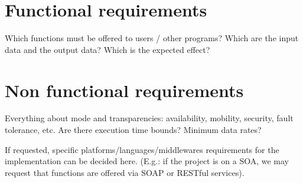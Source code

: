 
\section{Functional requirements}
\label{sec:func-req}
Which functions must be offered to users / other programs?
Which are the input data and the output data?
Which is the expected effect?


\section{Non functional requirements}
\label{sec:nonfunc-req}
Everything about mode and transparencies:
availability, mobility, security, fault tolerance, etc.
Are there execution time bounds? Minimum data rates?

If requested, specific platforms/languages/middlewares requirements
for the implementation can be decided here.
(E.g.: if the project is on a SOA, we may request that functions
are offered via SOAP or RESTful services).
